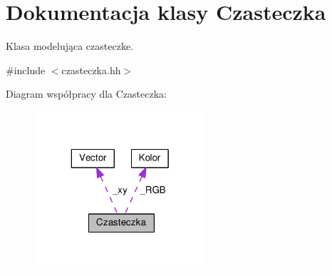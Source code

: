 \hypertarget{class_czasteczka}{\section{Dokumentacja klasy Czasteczka}
\label{class_czasteczka}
}


Klasa modelująca czasteczke.  




{\ttfamily \#include $<$czasteczka.\-hh$>$}



Diagram współpracy dla Czasteczka\-:\nopagebreak
\begin{figure}[H]
\begin{center}
\leavevmode
\includegraphics[width=181pt]{class_czasteczka__coll__graph}
\end{center}
\end{figure}
